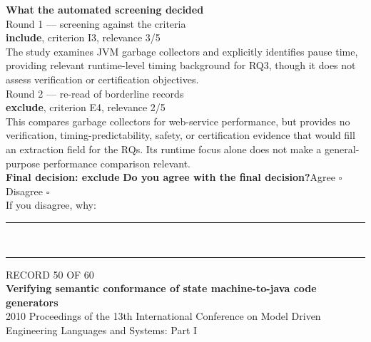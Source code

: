 \documentclass[11pt,a4paper]{article}
\begin{document}
\vspace{3mm}
\vspace{2.5mm}
{\small\textbf{What the automated screening decided}}\\[2mm]
{\footnotesize\color{soft}Round 1 --- screening against the criteria}\\[0.5mm]
{\small\textbf{include}, criterion I3, relevance 3/5}\\[0.5mm]
{\small The study examines JVM garbage collectors and explicitly identifies pause time, providing relevant runtime-level timing background for RQ3, though it does not assess verification or certification objectives.}\\[2.5mm]
{\footnotesize\color{soft}Round 2 --- re-read of borderline records}\\[0.5mm]
{\small\textbf{exclude}, criterion E4, relevance 2/5}\\[0.5mm]
{\small This compares garbage collectors for web-service performance, but provides no verification, timing-predictability, safety, or certification evidence that would fill an extraction field for the RQs. Its runtime focus alone does not make a general-purpose performance comparison relevant.}\\[2.5mm]
{\small\textbf{Final decision: exclude}}
\vspace{2mm}
{\small\textbf{Do you agree with the final decision?}\quad{}Agree $\square$\qquad{}Disagree $\square$}\\[1mm]
{\footnotesize\color{soft}If you disagree, why:}\\[1mm]
\color{rule}\rule{\linewidth}{0.3pt}\\[3mm]\rule{\linewidth}{0.3pt}\color{black}
\clearpage
{\color{soft}\footnotesize RECORD 50 OF 60}\\[1mm]
{\large\bfseries Verifying semantic conformance of state machine-to-java code generators}\\[1.5mm]
{\color{soft}\small 2010 \textperiodcentered{} Proceedings of the 13th International Conference on Model Driven Engineering Languages and Systems: Part I}\\[2mm]
\end{document}

